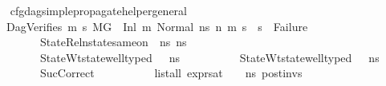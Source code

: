 \begin{isabellebody}
\ \ \isamarkupfalse%
\isanewline
{}\isamarkupfalse%
%
\endisatagproof
{\isafoldproof}%
%
\isadelimproof
\isanewline
%
\endisadelimproof
\isanewline
{}\isamarkupfalse%
\ cfg{\isacharunderscore}{\kern0pt}dag{\isacharunderscore}{\kern0pt}simple{\isacharunderscore}{\kern0pt}propagate{\isacharunderscore}{\kern0pt}helper{\isacharunderscore}{\kern0pt}general{\isacharcolon}{\kern0pt}\isanewline
\ \ \ DagVerifies{\isacharcolon}{\kern0pt}{\isachardoublequoteopen}{\isasymforall}\ m{}{\isacharprime}{\kern0pt}\ s{}{\isacharprime}{\kern0pt}{\isachardot}{\kern0pt}\ {\isacharparenleft}{\kern0pt}{\isacharparenleft}{\kern0pt}M{\isacharcomma}{\kern0pt}{\isasymLambda}{\isacharcomma}{\kern0pt}{\isasymGamma}{\isacharcomma}{\kern0pt}{\isasymOmega}{\isacharcomma}{\kern0pt}G\ {\isasymturnstile}\ {\isacharparenleft}{\kern0pt}Inl\ m{\isacharcomma}{\kern0pt}\ Normal\ ns{}{\isacharparenright}{\kern0pt}\ {\isacharminus}{\kern0pt}n{\isasymrightarrow}{\isacharasterisk}{\kern0pt}\ {\isacharparenleft}{\kern0pt}m{}{\isacharprime}{\kern0pt}{\isacharcomma}{\kern0pt}\ s{}{\isacharprime}{\kern0pt}{\isacharparenright}{\kern0pt}{\isacharparenright}{\kern0pt}\ {\isasymlongrightarrow}\ {\isacharparenleft}{\kern0pt}s{}{\isacharprime}{\kern0pt}\ {\isasymnoteq}\ Failure{\isacharparenright}{\kern0pt}{\isacharparenright}{\kern0pt}{\isachardoublequoteclose}\ \isanewline
\ \ \ \ \ \ \ \ \ StateRel{\isacharcolon}{\kern0pt}{\isachardoublequoteopen}nstate{\isacharunderscore}{\kern0pt}same{\isacharunderscore}{\kern0pt}on\ {\isasymLambda}\ ns{}\ ns{}\ {\isacharbraceleft}{\kern0pt}{\isacharbraceright}{\kern0pt}{\isachardoublequoteclose}\ \isanewline
\ \ \ \ \ \ \ \ \ StateWt{\isacharcolon}{\kern0pt}{\isachardoublequoteopen}state{\isacharunderscore}{\kern0pt}well{\isacharunderscore}{\kern0pt}typed\ {\isasymLambda}\ {\isasymOmega}\ ns{}{\isachardoublequoteclose}\ \isanewline
\ \ \ \ \ \ \ \ \ StateWt{}{\isacharcolon}{\kern0pt}{\isachardoublequoteopen}state{\isacharunderscore}{\kern0pt}well{\isacharunderscore}{\kern0pt}typed\ {\isasymLambda}\ {\isasymOmega}\ ns{}{\isachardoublequoteclose}\ \ \isanewline
\ \ \ \ \ \ \ \ \ SucCorrect{\isacharcolon}{\kern0pt}\isanewline
\ \ \ \ \ \ \ \ \ \ {\isachardoublequoteopen}list{\isacharunderscore}{\kern0pt}all\ {\isacharparenleft}{\kern0pt}expr{\isacharunderscore}{\kern0pt}sat\ {\isasymLambda}\ {\isasymGamma}\ {\isasymOmega}\ ns{}{\isacharparenright}{\kern0pt}\ post{\isacharunderscore}{\kern0pt}invs\ {\isasymLongrightarrow}\ \isanewline

\end{isabellebody}
